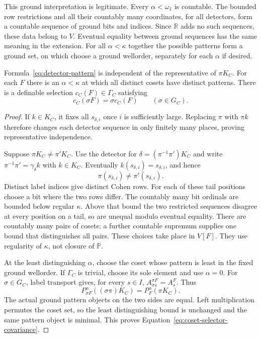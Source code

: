 This ground interpretation is legitimate. Every $\alpha<\omega_1$
is countable. The bounded row restrictions and all their countably
many coordinates, for all detectors, form a countable sequence of
ground bits and indices. Since $\mathbb R$ adds no such sequences,
these data belong to $V$. Eventual equality between ground sequences
has the same meaning in the extension. For all $\alpha<\kappa$
together the possible patterns form a ground set, on which choose a
ground wellorder, separately for each $\alpha$ if desired.

\begin{lemma}\label{lem:coset-selector}
Formula~\eqref{eq:detector-pattern} is independent of the
representative of $\pi K_C$. For each $F$ there is an
$\alpha<\kappa$ at which all distinct cosets have distinct patterns.
There is a definable selection $c_C(F)\in\Gamma_C$ satisfying
\begin{equation}\label{eq:coset-selector-covariance}
 c_C(\sigma F)=\sigma c_C(F)\qquad(\sigma\in G_C).
\end{equation}
\end{lemma}
\begin{proof}
If $k\in K_C$, it fixes all $s_{\delta,i}$ once $i$ is sufficiently
large. Replacing $\pi$ with $\pi k$ therefore changes each detector
sequence in only finitely many places, proving representative
independence.

Suppose $\pi K_C\ne\pi'K_C$. Use the detector for
$\delta=(\pi^{-1}\pi')K_C$ and write
$\pi^{-1}\pi'=\gamma_\delta k$ with $k\in K_C$. Eventually
$k(s_{\delta,i})=s_{\delta,i}$, and hence
\[
 \pi(s_{\delta,i})\ne\pi'(s_{\delta,i}).
\]
Distinct label indices give distinct Cohen rows. For each of these
tail positions choose a bit where the two rows differ. The countably
many bit ordinals are bounded below regular $\kappa$. Above that
bound the two restricted sequences disagree at every position on a
tail, so are unequal modulo eventual equality. There are countably
many pairs of cosets; a further countable supremum supplies one bound
that distinguishes all pairs. These choices take place in $V[F]$.
They use regularity of $\kappa$, not closure of $\mathbb P$.

At the least distinguishing $\alpha$, choose the coset whose pattern
is least in the fixed ground wellorder. If $\Gamma_C$ is trivial,
choose its sole element and use $\alpha=0$. For $\sigma\in G_C$,
label transport gives, for every $s\in I$,
$A_{\sigma s}^{\sigma F}=A_s^F$. Thus
\begin{equation}\label{eq:pattern-covariance}
 P_{\sigma F}^\alpha((\sigma\pi)K_C)
                    =P_F^\alpha(\pi K_C).
\end{equation}
The actual ground pattern objects on the two sides are equal. Left
multiplication permutes the coset set, so the least distinguishing
bound is unchanged and the same pattern object is minimal. This
proves Equation~\eqref{eq:coset-selector-covariance}.
\end{proof}

